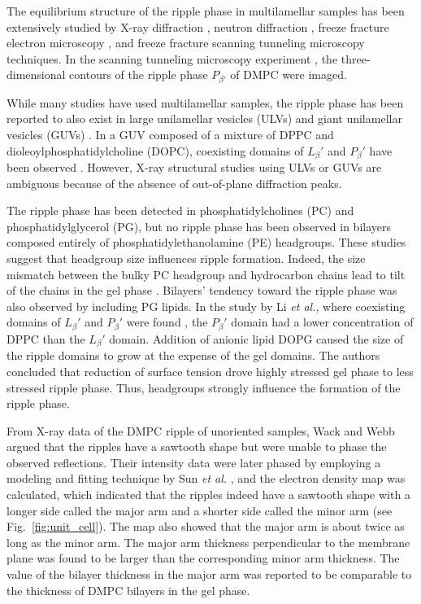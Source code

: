 The equilibrium structure of the ripple phase in multilamellar samples has been 
extensively studied by
X-ray diffraction \cite{ref:Janiak76,ref:Janiak79,ref:Tardieu73,ref:Wack89,ref:Yao91,ref:Sun96,ref:Cunningham98,
ref:Sengupta99,ref:Sengupta00,ref:Sengupta03},
neutron diffraction \cite{ref:Mortensen88,ref:Bradshaw89}, 
freeze fracture electron microscopy \cite{ref:Woodward96,ref:Copeland80,ref:Ruppel83},
and freeze fracture scanning tunneling microscopy \cite{ref:Zasadzinski88} techniques.
In the scanning tunneling microscopy experiment \cite{ref:Zasadzinski88}, 
the three-dimensional contours of the ripple phase $P_{\beta'}$ of
DMPC were imaged.

While many studies have used multilamellar samples, the ripple phase has been reported
to also exist in large unilamellar vesicles (ULVs) \cite{ref:Mason99,ref:Parente84}
and giant unilamellar vesicles (GUVs) \cite{ref:Li06}. 
In a GUV composed of a mixture of DPPC and 
dioleoylphosphatidylcholine (\acs{DOPC}), 
coexisting domains of $L_\beta'$ and $P_\beta'$ have been observed \cite{ref:Li06}.
However, X-ray structural studies using ULVs or GUVs are ambiguous
because of the absence of out-of-plane diffraction peaks. 

The ripple phase has been detected in
phosphatidylcholines (\acs{PC}) and phosphatidylglycerol (\acs{PG}),
but no ripple phase has been observed in bilayers composed entirely of 
phosphatidylethanolamine (\acs{PE}) headgroups.
These studies suggest that headgroup size influences
ripple formation. Indeed, the size mismatch
between the bulky PC headgroup and hydrocarbon chains lead to tilt of 
the chains in the gel phase \cite{ref:Nagle76,ref:Mcintosh80,Nagle00}. 
Bilayers' tendency toward the ripple phase was also observed by including PG lipids.
In the study by Li \textit{et al.}, where  
coexisting domains of $L_\beta'$ and $P_\beta'$ were found \cite{ref:Li06},
the $P_\beta'$ domain had a lower concentration of DPPC than the $L_\beta'$
domain. 
Addition of anionic lipid DOPG caused the size of the ripple domains
to grow at the expense of the gel domains. The authors concluded that reduction of 
surface tension drove highly stressed gel phase to less stressed ripple phase.
Thus, headgroups strongly influence the formation of the ripple phase.

From X-ray data of the DMPC ripple of unoriented samples, 
Wack and Webb \cite{ref:Wack89} argued that the ripples have a sawtooth shape
but were unable to phase the observed reflections.
Their intensity data were later
phased by employing a modeling and fitting technique by Sun \textit{et al.}
\cite{ref:Sun96}, and the electron density map was calculated, which indicated that  
the ripples indeed have a sawtooth shape with a longer side called the major arm
and a shorter side called the minor arm (see Fig.~\ref{fig:unit_cell}). 
The map also showed that the major arm is about twice as long as the minor arm. 
The major arm thickness perpendicular to the membrane plane 
was found to be larger than the corresponding minor arm thickness. 
The value of the bilayer thickness in the major arm was reported
to be comparable to the thickness of DMPC bilayers in the gel phase.

